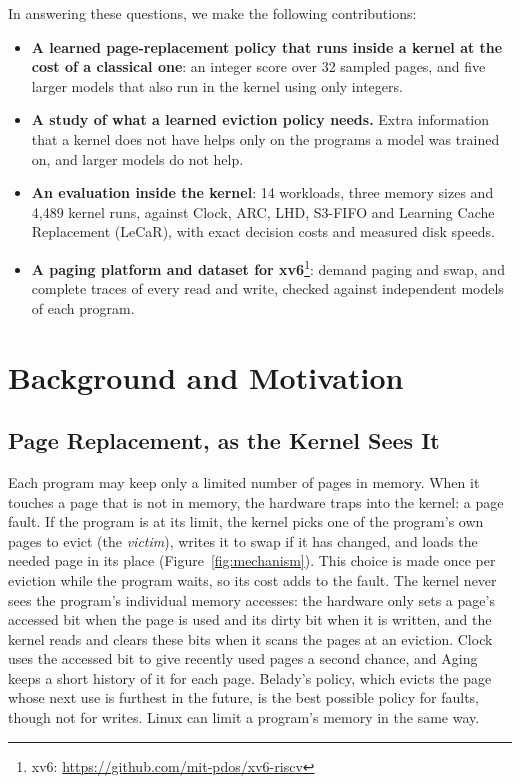 \documentclass{article}
\newcommand{\clock}{Clock\xspace}
\newcommand{\belady}{Belady\xspace}
\begin{document}
In answering these questions, we make the following contributions:
\begin{itemize}[topsep=3pt, itemsep=2pt, parsep=0pt]
\item \textbf{A learned page-replacement policy that runs inside a kernel at the cost of a classical one}: an integer score over 32 sampled pages, and five larger models that also run in the kernel using only integers.
\item \textbf{A study of what a learned eviction policy needs.} Extra information that a kernel does not have helps only on the programs a model was trained on, and larger models do not help.
\item \textbf{An evaluation inside the kernel}: 14 workloads, three memory sizes and 4,489 kernel runs, against \clock, ARC, LHD, S3-FIFO and Learning Cache Replacement (LeCaR), with exact decision costs and measured disk speeds.
\item \textbf{A paging platform and dataset for xv6}\footnote{\raggedright xv6: \url{https://github.com/mit-pdos/xv6-riscv}}: demand paging and swap, and complete traces of every read and write, checked against independent models of each program.
\end{itemize}

\section{Background and Motivation}
\label{sec:bg}

\subsection{Page Replacement, as the Kernel Sees It}
\label{sec:bg-mechanism}

Each program may keep only a limited number of pages in memory. When it touches a page that is not in memory, the hardware traps into the kernel: a page fault. If the program is at its limit, the kernel picks one of the program's own pages to evict (the \emph{victim}), writes it to swap if it has changed, and loads the needed page in its place (Figure~\ref{fig:mechanism}). This choice is made once per eviction while the program waits, so its cost adds to the fault. The kernel never sees the program's individual memory accesses: the hardware only sets a page's accessed bit when the page is used and its dirty bit when it is written, and the kernel reads and clears these bits when it scans the pages at an eviction. \clock uses the accessed bit to give recently used pages a second chance, and Aging keeps a short history of it for each page. \belady's policy, which evicts the page whose next use is furthest in the future, is the best possible policy for faults, though not for writes. Linux can limit a program's memory in the same way.
\end{document}
